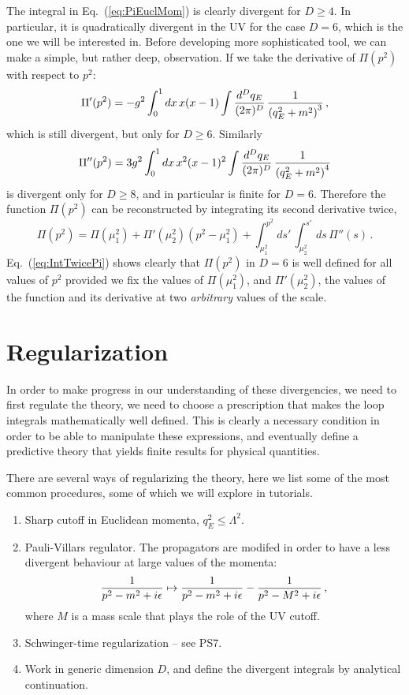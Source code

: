The integral in Eq.~(\ref{eq:PiEuclMom}) is clearly divergent for
$D\geq 4$. In particular, it is quadratically divergent in the UV for
the case $D=6$, which is the one we will be interested in. Before
developing more sophisticated tool, we can make a simple, but rather
deep, observation. If we take the derivative of $\Pi(p^2)$ with
respect to $p^2$:
\begin{equation}
  \label{eq:PiPrimeInt}
  \Pi'(p^2) = -g^2 \int_0^1dx\, x(x-1) \int \frac{d^Dq_E}{(2\pi)^D}\,
  \frac{1}{\left(q_E^2+m^2\right)^3}\, ,
\end{equation}
which is still divergent, but only for $D\geq 6$. Similarly
\begin{equation}
  \label{eq:PiDoublePrimeInt}
  \Pi''(p^2) = 3g^2 \int_0^1dx\, x^2(x-1)^2 \int \frac{d^Dq_E}{(2\pi)^D}\,
  \frac{1}{\left(q_E^2+m^2\right)^4}
\end{equation}
is divergent only for $D\geq 8$, and in particular is finite for
$D=6$. Therefore the function $\Pi(p^2)$ can be reconstructed by
integrating its second derivative twice,
\begin{equation}
  \label{eq:IntTwicePi}
  \Pi(p^2) = \Pi(\mu_1^2) + \Pi'(\mu_2^2) \left(p^2-\mu_1^2\right) +
  \int_{\mu_1^2}^{p^2} ds'\, \int_{\mu_2^2}^{s'} ds\, \Pi''(s)\, .  
\end{equation}
Eq.~(\ref{eq:IntTwicePi}) shows clearly that $\Pi(p^2)$ in $D=6$ is well
defined for all values of $p^2$ provided we fix the values of
$\Pi(\mu_1^2)$, and $\Pi'(\mu_2^2)$, \ie the values of the function
and its derivative at two {\em arbitrary} values of the scale.

\section{Regularization}
\label{sec:regularization}

In order to make progress in our understanding of these divergencies,
we need to first regulate the theory, \ie we need to choose a
prescription that makes the loop integrals mathematically well
defined. This is clearly a necessary condition in order to be able to
manipulate these expressions, and eventually define a predictive
theory that yields finite results for physical quantities.

There are several ways of regularizing the theory, here we list some
of the most common procedures, some of which we will explore in
tutorials.
\begin{enumerate}
\item Sharp cutoff in Euclidean momenta, $q_E^2\leq \Lambda^2$.
\item Pauli-Villars regulator. The propagators are modifed in order to
  have a less divergent behaviour at large values of the momenta:
  \begin{equation}
    \label{eq:PVReg}
    \frac{1}{p^2-m^2+i\epsilon} \mapsto \frac{1}{p^2-m^2+i\epsilon} - \frac{1}{p^2-M^2+i\epsilon}\, ,
  \end{equation}
  where $M$ is a mass scale that plays the role of the UV cutoff.
\item Schwinger-time regularization -- see PS7.
\item Work in generic dimension $D$, and define the divergent
  integrals by analytical continuation. 
\end{enumerate}

